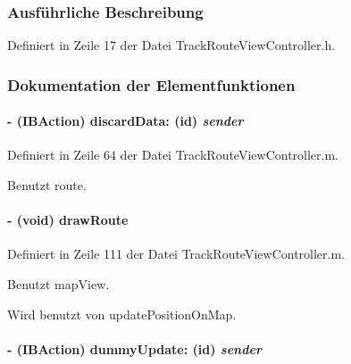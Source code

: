 \subsubsection{Ausführliche Beschreibung}


Definiert in Zeile 17 der Datei TrackRouteViewController.h.

\subsubsection{Dokumentation der Elementfunktionen}
\hypertarget{interface_track_route_view_controller_addff528a677e807a710e4c1c08f3f960}{
\paragraph[{discardData:}]{\setlength{\rightskip}{0pt plus 5cm}-\/ (IBAction) discardData: (id) {\em sender}}\hfill}
\label{interface_track_route_view_controller_addff528a677e807a710e4c1c08f3f960}


Definiert in Zeile 64 der Datei TrackRouteViewController.m.

Benutzt route.\hypertarget{interface_track_route_view_controller_aa35a93f4325aa79c0043310d34ae0a35}{
\paragraph[{drawRoute}]{\setlength{\rightskip}{0pt plus 5cm}-\/ (void) drawRoute }\hfill}
\label{interface_track_route_view_controller_aa35a93f4325aa79c0043310d34ae0a35}


Definiert in Zeile 111 der Datei TrackRouteViewController.m.

Benutzt mapView.

Wird benutzt von updatePositionOnMap.\hypertarget{interface_track_route_view_controller_ac8d668c4e9c5a18e68512d2feb276ca1}{
\paragraph[{dummyUpdate:}]{\setlength{\rightskip}{0pt plus 5cm}-\/ (IBAction) dummyUpdate: (id) {\em sender}}\hfill}
\label{interface_track_route_view_controller_ac8d668c4e9c5a18e68512d2feb276ca1}


